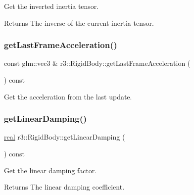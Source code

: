 Get the inverted inertia tensor. 

\begin{DoxyReturn}{Returns}
The inverse of the current inertia tensor. 
\end{DoxyReturn}
\mbox{\label{classr3_1_1_rigid_body_a0107527952d289050043c9625a7818ee}} 
\subsubsection{\texorpdfstring{get\+Last\+Frame\+Acceleration()}{getLastFrameAcceleration()}}
{\footnotesize\ttfamily const glm\+::vec3 \& r3\+::\+Rigid\+Body\+::get\+Last\+Frame\+Acceleration (\begin{DoxyParamCaption}{ }\end{DoxyParamCaption}) const}



Get the acceleration from the last update. 

\mbox{\label{classr3_1_1_rigid_body_ab48c055a703f1d3d84b9f1977ef504e6}} 
\subsubsection{\texorpdfstring{get\+Linear\+Damping()}{getLinearDamping()}}
{\footnotesize\ttfamily \mbox{\hyperlink{namespacer3_ab2016b3e3f743fb735afce242f0dc1eb}{real}} r3\+::\+Rigid\+Body\+::get\+Linear\+Damping (\begin{DoxyParamCaption}{ }\end{DoxyParamCaption}) const}



Get the linear damping factor. 

\begin{DoxyReturn}{Returns}
The linear damping coefficient. 
\end{DoxyReturn}
\mbox{\label{classr3_1_1_rigid_body_a171ee8190ba1c7c2a40c5faf8d654170}} 
